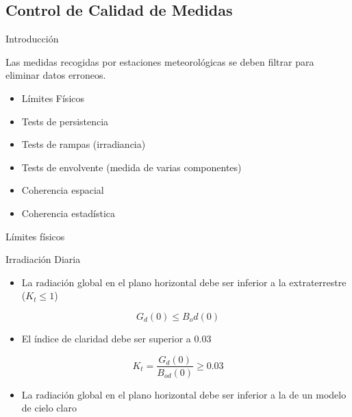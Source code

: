 \documentclass[xcolor={usenames,svgnames,dvipsnames}]{beamer}
\begin{document}
\subsection{Control de Calidad de Medidas}
\label{sec:orgba52e8c}

\begin{frame}[label={sec:orgfa33f25}]{Introducción}
\begin{block}{Las medidas recogidas por estaciones meteorológicas se deben filtrar para eliminar datos erroneos.}
\begin{itemize}
\item Límites Físicos
\item Tests de persistencia
\item Tests de rampas (irradiancia)
\item Tests de envolvente (medida de varias componentes)
\item Coherencia espacial
\item Coherencia estadística
\end{itemize}
\end{block}
\end{frame}



\begin{frame}[label={sec:orgf79aa2e}]{Límites físicos}
\begin{block}{Irradiación Diaria}
\begin{itemize}
\item La radiación global en el plano horizontal debe ser inferior a la extraterrestre (\(K_t \leq 1\))
\end{itemize}
\[
G_d(0) \leq B_od(0)
\]

\begin{itemize}
\item El índice de claridad debe ser superior a 0.03
\end{itemize}
\[
K_t = \frac{G_d(0)}{B_{od}(0)} \geq 0.03
\]

\begin{itemize}
\item La radiación global en el plano horizontal debe ser inferior a la de un modelo de cielo claro
\end{itemize}

\nocite{Younes.Claywell.ea2005, Estevez.Gavilan.ea2011, Geiger.Diabate.ea2002}
\end{block}
\end{frame}
\end{document}
